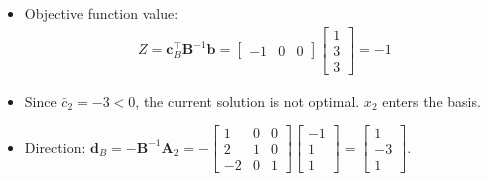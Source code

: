 \documentclass[11pt]{article}
\newcommand{\mb}[1]{\ensuremath{\boldsymbol{#1}}}
\begin{document}
\begin{enumerate}
\begin{itemize}
Using equation (5):
\begin{align*}
\bar{c}_2 &= c_2 - \mb{c}_B^\top\mb{B}^{-1}\mb{A}_2 = -2 - \begin{bmatrix} -1 & 0 & 0 \end{bmatrix} \begin{bmatrix} 1 & 0 & 0 \\ 2 & 1 & 0 \\ -2 & 0 & 1 \end{bmatrix} \begin{bmatrix} -1 \\ 1 \\ 1 \end{bmatrix} = -2 - (-1)(1) = -3 \\
\bar{c}_3 &= c_3 - \mb{c}_B^\top\mb{B}^{-1}\mb{A}_3 = 0 - \begin{bmatrix} -1 & 0 & 0 \end{bmatrix} \begin{bmatrix} 1 & 0 & 0 \\ 2 & 1 & 0 \\ -2 & 0 & 1 \end{bmatrix} \begin{bmatrix} 1 \\ 0 \\ 0 \end{bmatrix} = 0 - (-1)(1) = 1
\end{align*}

\item Objective function value:
\begin{align*}
Z = \mb{c}_B^\top\mb{B}^{-1}\mb{b} = \begin{bmatrix} -1 & 0 & 0 \end{bmatrix} \begin{bmatrix} 1 \\ 3 \\ 3 \end{bmatrix} = -1
\end{align*}

\item Since $\bar{c}_2 = -3 < 0$, the current solution is not optimal. $x_2$ enters the basis.

\item Direction: $\mb{d}_B = -\mb{B}^{-1}\mb{A}_2 = -\begin{bmatrix} 1 & 0 & 0 \\ 2 & 1 & 0 \\ -2 & 0 & 1 \end{bmatrix} \begin{bmatrix} -1 \\ 1 \\ 1 \end{bmatrix} = \begin{bmatrix} 1 \\ -3 \\ 1 \end{bmatrix}$.


\end{itemize}
\end{enumerate}
\end{document}
